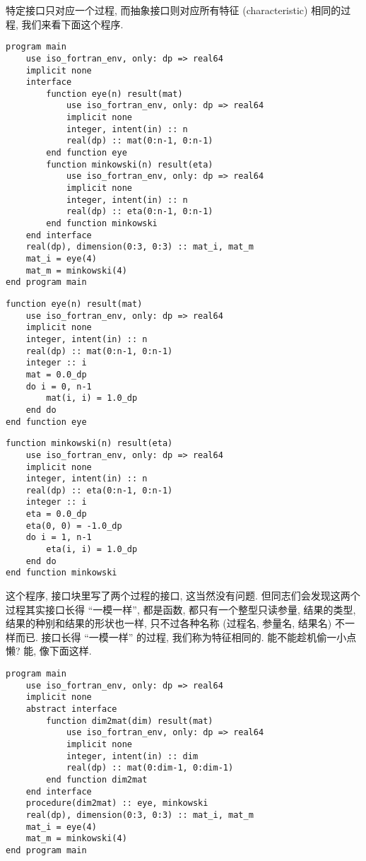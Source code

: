 特定接口只对应一个过程, 而抽象接口则对应所有特征 (characteristic) 相同的过程, 我们来看下面这个程序. 
\begin{lstlisting} 
program main
    use iso_fortran_env, only: dp => real64
    implicit none
    interface
        function eye(n) result(mat)
            use iso_fortran_env, only: dp => real64
            implicit none
            integer, intent(in) :: n
            real(dp) :: mat(0:n-1, 0:n-1)
        end function eye
        function minkowski(n) result(eta)
            use iso_fortran_env, only: dp => real64
            implicit none
            integer, intent(in) :: n
            real(dp) :: eta(0:n-1, 0:n-1)
        end function minkowski
    end interface
    real(dp), dimension(0:3, 0:3) :: mat_i, mat_m
    mat_i = eye(4)
    mat_m = minkowski(4)
end program main
\end{lstlisting}
\begin{lstlisting}
function eye(n) result(mat)
    use iso_fortran_env, only: dp => real64
    implicit none
    integer, intent(in) :: n
    real(dp) :: mat(0:n-1, 0:n-1)
    integer :: i
    mat = 0.0_dp
    do i = 0, n-1
        mat(i, i) = 1.0_dp
    end do
end function eye
\end{lstlisting}
\begin{lstlisting}
function minkowski(n) result(eta)
    use iso_fortran_env, only: dp => real64
    implicit none
    integer, intent(in) :: n
    real(dp) :: eta(0:n-1, 0:n-1)
    integer :: i
    eta = 0.0_dp
    eta(0, 0) = -1.0_dp
    do i = 1, n-1
        eta(i, i) = 1.0_dp
    end do
end function minkowski
\end{lstlisting} 
这个程序, 接口块里写了两个过程的接口, 这当然没有问题. 但同志们会发现这两个过程其实接口长得 ``一模一样'', 都是函数, 都只有一个整型只读参量, 结果的类型, 结果的种别和结果的形状也一样, 只不过各种名称 (过程名, 参量名, 结果名) 不一样而已. 接口长得 ``一模一样'' 的过程, 我们称为特征相同的. 能不能趁机偷一小点懒? 能, 像下面这样. 
\begin{lstlisting} 
program main
    use iso_fortran_env, only: dp => real64
    implicit none
    abstract interface
        function dim2mat(dim) result(mat)
            use iso_fortran_env, only: dp => real64
            implicit none
            integer, intent(in) :: dim
            real(dp) :: mat(0:dim-1, 0:dim-1)
        end function dim2mat
    end interface
    procedure(dim2mat) :: eye, minkowski
    real(dp), dimension(0:3, 0:3) :: mat_i, mat_m
    mat_i = eye(4)
    mat_m = minkowski(4)
end program main
\end{lstlisting}
